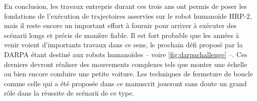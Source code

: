 En conclusion, les travaux entrepris durant ces trois ans ont permis
de poser les fondations de l'exécution de trajectoires asservies sur
le robot humanoïde HRP-2, mais il reste encore un important effort à
fournir pour arriver à exécuter des scénarii longs et précis de
manière fiable. Il est fort probable que les années à venir voient
d'importants travaux dans ce sens, le prochain défi proposé par la
DARPA \citep{12darpa} étant destiné aux robots humanoïdes
-- voire \autoref{fig:darpachallenge} --. Ces derniers devront
réaliser des mouvements complexes tels que monter une échelle ou bien
encore conduire une petite voiture. Les techniques de fermeture de
boucle comme celle qui a été proposée dans ce manuscrit joueront sans
doute un grand rôle dans la réussite de scénarii de ce type.

